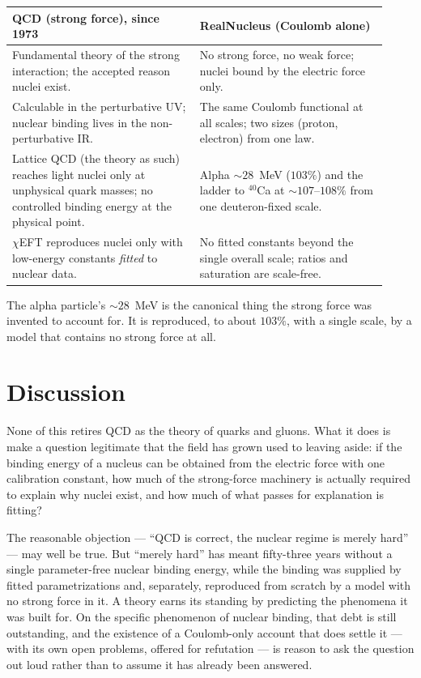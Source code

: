 \documentclass[11pt]{article}
\begin{document}
\begin{center}
\begin{tabular}{@{}p{0.46\linewidth} p{0.46\linewidth}@{}}
\toprule
\textbf{QCD (strong force), since 1973} & \textbf{RealNucleus (Coulomb alone)} \\
\midrule
Fundamental theory of the strong interaction; the accepted reason nuclei exist. &
No strong force, no weak force; nuclei bound by the electric force only. \\[4pt]
Calculable in the perturbative UV; nuclear binding lives in the non-perturbative IR. &
The same Coulomb functional at all scales; two sizes (proton, electron) from one law. \\[4pt]
Lattice QCD (the theory as such) reaches light nuclei only at unphysical quark masses; no controlled
binding energy at the physical point. &
Alpha $\sim 28$~MeV ($103\%$) and the ladder to ${}^{40}$Ca at $\sim 107$--$108\%$ from one deuteron-fixed scale. \\[4pt]
$\chi$EFT reproduces nuclei only with low-energy constants \emph{fitted} to nuclear data. &
No fitted constants beyond the single overall scale; ratios and saturation are scale-free. \\
\bottomrule
\end{tabular}
\end{center}

The alpha particle's $\sim 28$~MeV is the canonical thing the strong force was invented to account for.
It is reproduced, to about $103\%$, with a single scale, by a model that contains no strong force at all.

\section{Discussion}
\label{sec:discussion}

None of this retires QCD as the theory of quarks and gluons. What it does is make a question legitimate
that the field has grown used to leaving aside: if the binding energy of a nucleus can be obtained from
the electric force with one calibration constant, how much of the strong-force machinery is actually
required to explain why nuclei exist, and how much of what passes for explanation is fitting?

The reasonable objection --- ``QCD is correct, the nuclear regime is merely hard'' --- may well be true.
But ``merely hard'' has meant fifty-three years without a single parameter-free nuclear binding energy,
while the binding was supplied by fitted parametrizations and, separately, reproduced from scratch by a
model with no strong force in it. A theory earns its standing by predicting the phenomena it was built
for. On the specific phenomenon of nuclear binding, that debt is still outstanding, and the existence of
a Coulomb-only account that does settle it --- with its own open problems, offered for refutation ---
is reason to ask the question out loud rather than to assume it has already been answered.
\end{document}
